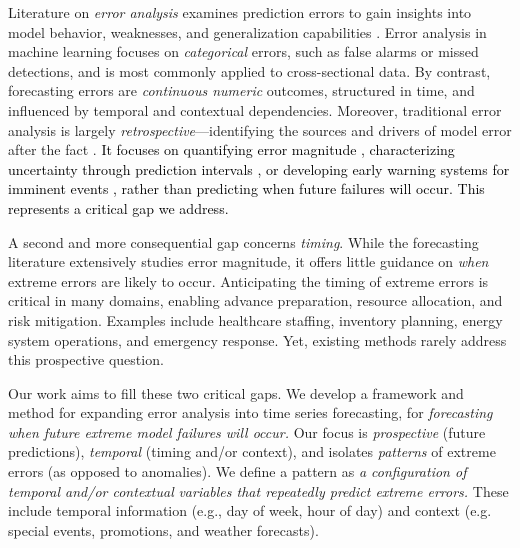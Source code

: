 \documentclass[]{interact}
\newcommand{\matt}[1]{\textcolor{black}{#1}}
\theoremstyle{plain}
\theoremstyle{definition}
\theoremstyle{remark}
\begin{document}
Literature on \emph{error analysis} examines prediction errors to gain insights into model behavior, weaknesses, and  generalization capabilities \citep{cakmak2024}. Error analysis in machine learning focuses on \emph{categorical} errors, such as false alarms or missed detections, and is most commonly applied to cross-sectional data. By contrast, forecasting errors are \emph{continuous numeric} outcomes, structured in time, and influenced by temporal and contextual dependencies. Moreover, traditional error analysis is largely \emph{retrospective}---identifying the sources and drivers of model error after the fact \citep{cakmak2024}. \matt{It focuses on quantifying error magnitude \citep{kim2020}, characterizing uncertainty through prediction intervals \citep{salem2020}, or developing early warning systems for imminent events \citep{shmueli2010}, rather than predicting when future failures will occur. This represents a critical gap we address.}

A second and more consequential gap concerns \emph{timing}. While the forecasting literature extensively studies error magnitude, it offers little guidance on \emph{when} extreme errors are likely to occur. Anticipating the timing of extreme errors is critical in many domains, enabling advance preparation, resource allocation, and risk mitigation. Examples include healthcare staffing, inventory planning, energy system operations, and emergency response. Yet, existing methods rarely address this prospective question.

Our work aims to fill these two critical gaps. We develop a framework and method for expanding error analysis into time series forecasting, for \textit{forecasting} \textit{when future extreme model failures will occur.} Our focus is \textit{prospective} (future predictions), \textit{temporal} (timing and/or context), and isolates \textit{patterns} of extreme errors (as opposed to anomalies). We define a pattern as \textit{a configuration of temporal and/or contextual} \textit{variables that repeatedly predict extreme errors.} These include temporal information (e.g., day of week, hour of day) and context (e.g. special events, promotions, and weather forecasts).

\renewcommand{\arraystretch}{1.3}
\end{document}
